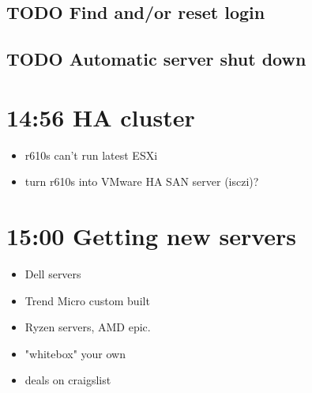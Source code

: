 \documentclass[11pt]{article}
\begin{document}
\subsection*{{\bfseries\sffamily TODO} Find and/or reset login}
\label{sec:org186eb10}
\subsection*{{\bfseries\sffamily TODO} Automatic server shut down}
\label{sec:orgae71a58}

\section*{14:56 HA cluster}
\label{sec:orgf734d88}
\begin{itemize}
\item r610s can't run latest ESXi
\item turn r610s into VMware HA SAN server (isczi)?
\end{itemize}

\section*{15:00 Getting new servers}
\label{sec:org201d5b3}
\begin{itemize}
\item Dell servers
\item Trend Micro custom built
\item Ryzen servers, AMD epic.
\item "whitebox" your own
\item deals on craigslist
\end{itemize}
\end{document}
